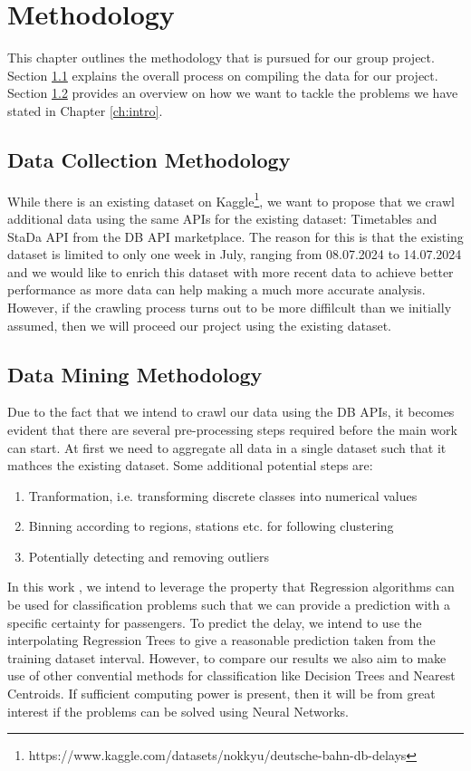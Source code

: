 \documentclass[a4paper,oneside,bibliography=totoc]{scrbook}
\begin{document}
\chapter{Methodology}
\label{ch:methodology}
This chapter outlines the methodology that is pursued for our group project. Section \ref{sec:dataset} explains the overall process on compiling the data for our project. Section \ref{sec:data-mining-methodology} provides an overview on how we want to tackle the problems we have stated in Chapter \ref{ch:intro}.

\section{Data Collection Methodology}\label{sec:dataset}
While there is an existing dataset on Kaggle\footnote{https://www.kaggle.com/datasets/nokkyu/deutsche-bahn-db-delays}, we want to propose that we crawl additional data using the same APIs for the existing dataset: Timetables and StaDa API from the DB API marketplace.
The reason for this is that the existing dataset is limited to only one week in July, ranging from 08.07.2024 to 14.07.2024 and we would like to enrich this dataset with more recent data to achieve better performance as more data can help making a much more accurate analysis.
However, if the crawling process turns out to be more diffilcult than we initially assumed, then we will proceed our project using the existing dataset.

\section{Data Mining Methodology}\label{sec:data-mining-methodology}
Due to the fact that we intend to crawl our data using the DB APIs, it becomes evident that there are several pre-processing steps required before the main work can start. At first we need to aggregate all data in a single dataset such that it mathces the existing dataset.
Some additional potential steps are:
\begin{enumerate}
    \item Tranformation, i.e. transforming discrete classes into numerical values
    \item Binning according to regions, stations etc. for following clustering
    \item Potentially detecting and removing outliers
\end{enumerate}
In this work , we intend to leverage the property that Regression algorithms can be used for classification problems such that we can provide a prediction with a specific certainty for passengers. To predict the delay, we intend to
use the interpolating Regression Trees to give a reasonable prediction taken from the training dataset interval. However, to compare our results we also aim to make use of other convential methods for classification like Decision Trees and Nearest Centroids.
If sufficient computing power is present, then it will be from great interest if the problems can be solved using Neural Networks.
\end{document}
